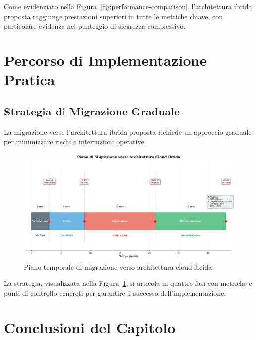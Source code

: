 Come evidenziato nella Figura~\ref{fig:performance-comparison}, l'architettura ibrida proposta raggiunge prestazioni superiori in tutte le metriche chiave, con particolare evidenza nel punteggio di sicurezza complessivo.

\section{\texorpdfstring{Percorso di Implementazione Pratica}{3.4 - Percorso di Implementazione Pratica}}
\label{sec:implementazione}

\subsection{\texorpdfstring{Strategia di Migrazione Graduale}{3.4.1 - Strategia di Migrazione Graduale}}
\label{subsec:migrazione-graduale}

La migrazione verso l'architettura ibrida proposta richiede un approccio graduale per minimizzare rischi e interruzioni operative.

\begin{figure}[htbp]
\centering
\includegraphics[width=\textwidth]{thesis_figures/cap4/fig_3_5_migration_timeline.pdf}
\caption{Piano temporale di migrazione verso architettura cloud ibrida}
\label{fig:migration-timeline}
\end{figure}

La strategia, visualizzata nella Figura~\ref{fig:migration-timeline}, si articola in quattro fasi con metriche e punti di controllo concreti per garantire il successo dell'implementazione.

\section{\texorpdfstring{Conclusioni del Capitolo}{3.5 - Conclusioni del Capitolo}}
\label{sec:conclusioni-cap3}

